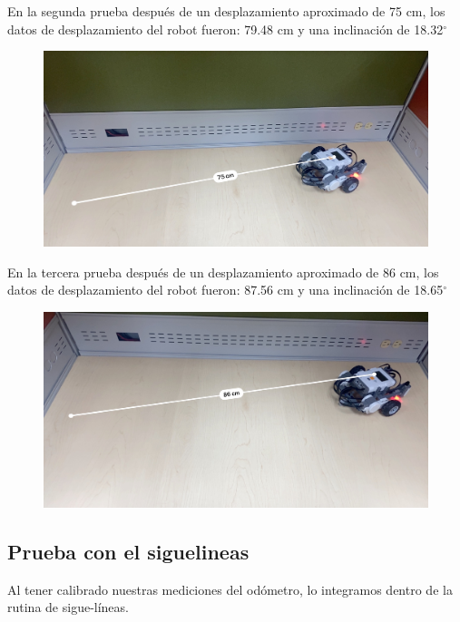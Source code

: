 \documentclass[oneside,onecolumn]{article}
\begin{document}
\newpage
En la segunda prueba después de un desplazamiento aproximado de 75 cm, los datos de desplazamiento del robot fueron: 79.48 cm y una inclinación de 18.32$^{\circ}$
\begin{figure}[!hb]
  \centering
  \includegraphics[scale=0.18]{graficos/prueba2.JPG}
\end{figure}

En la tercera prueba después de un desplazamiento aproximado de 86 cm, los datos de desplazamiento del robot fueron: 87.56 cm y una inclinación de 18.65$^{\circ}$

\begin{figure}[!hb]
  \centering
  \includegraphics[scale=0.18]{graficos/prueba3.JPG}
\end{figure}

\newpage
\subsection{Prueba con el siguelineas}

Al tener calibrado nuestras mediciones del odómetro, lo integramos dentro de la rutina de sigue-líneas.
\end{document}

